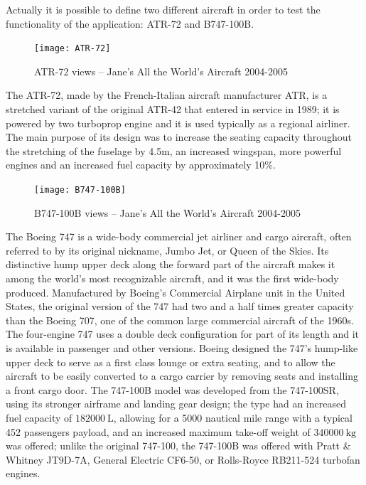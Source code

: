 \bigskip
\noindent
Actually it is possible to define two different aircraft in order to test the functionality of the application: ATR-72 and B747-100B.
%
\begin{figure}[!t]
\centering
\texttt{[image: ATR-72]}
\caption{ATR-72 views – Jane's All the World's Aircraft 2004-2005\cite{janes}}
\label{fig:Figure6}
\end{figure}

\bigskip
\noindent
The ATR-72, made by the French-Italian aircraft manufacturer ATR, is a stretched variant of the original ATR-42 that entered in service in 1989; it is powered by two turboprop engine and it is used typically as a regional airliner. The main purpose of its design was to increase the seating capacity throughout the stretching of the fuselage by 4.5m, an increased wingspan, more powerful engines and an increased fuel capacity by approximately 10$\%$.\cite{wiki:atr72}
%
\begin{figure}[!b]
\centering
\texttt{[image: B747-100B]}
\caption{B747-100B views – Jane's All the World's Aircraft 2004-2005\cite{janes}}
\label{fig:Figure7}
\end{figure}

\bigskip
\noindent
The Boeing 747 is a wide-body commercial jet airliner and cargo aircraft, often referred to by its original nickname, Jumbo Jet, or Queen of the Skies. Its distinctive hump upper deck along the forward part of the aircraft makes it among the world's most recognizable aircraft, and it was the first wide-body produced. Manufactured by Boeing's Commercial Airplane unit in the United States, the original version of the 747 had two and a half times greater capacity than the Boeing 707, one of the common large commercial aircraft of the 1960s. The four-engine 747 uses a double deck configuration for part of its length and it is available in passenger and other versions. Boeing designed the 747's hump-like upper deck to serve as a first class lounge or extra seating, and to allow the aircraft to be easily converted to a cargo carrier by removing seats and installing a front cargo door. The 747-100B model was developed from the 747-100SR, using its stronger airframe and landing gear design; the type had an increased fuel capacity of $\SI{182000}{\liter}$, allowing for a 5000 nautical mile range with a typical 452 passengers payload, and an increased maximum take-off weight of $\SI{340000}{\kilogram}$ was offered; unlike the original 747-100, the 747-100B was offered with Pratt \& Whitney JT9D-7A, General Electric CF6-50, or Rolls-Royce RB211-524 turbofan engines.\cite{wiki:b747}

